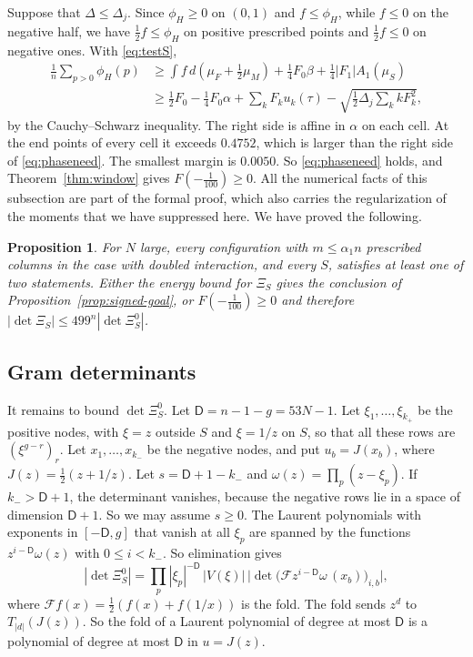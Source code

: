 \documentclass[11pt]{amsart}
\newtheorem{proposition}[theorem]{Proposition}
\theoremstyle{definition}
\theoremstyle{remark}
\numberwithin{equation}{section}
\begin{document}
Suppose that $\Delta\le\Delta_j$. Since $\phi_H\ge0$ on $(0,1)$ and $f\le\phi_H$, while $f\le0$ on the negative
half, we have $\frac12f\le\phi_H$ on positive prescribed points and $\frac12f\le0$ on negative ones. With
\eqref{eq:testS},
\begin{align*}
 \frac1n\sum_{p>0}\phi_H(p)&\ge\int f\,d(\mu_F+\tfrac12\mu_M)+\tfrac14F_0\beta+\tfrac14|F_1|A_1(\mu_S)\\
 &\ge\tfrac12F_0-\tfrac14F_0\alpha+\sum_kF_ku_k(\tau)-\sqrt{\tfrac12\Delta_j\sum_kkF_k^2},
\end{align*}
by the Cauchy--Schwarz inequality. The right side is affine in $\alpha$ on each cell. At the end points of every cell it exceeds
$0.4752$, which is larger than the right side of \eqref{eq:phaseneed}. The smallest margin is $0.0050$. So \eqref{eq:phaseneed} holds, and
Theorem~\ref{thm:window} gives $F(-\frac1{100})\ge0$. All the numerical facts of this subsection are part of the formal proof, which also carries the regularization of the moments that we have suppressed here. We have proved the following.

\begin{proposition}\label{prop:alternative}
For $N$ large, every configuration with $m\le\alpha_1n$ prescribed columns in the case with doubled interaction, and
every $S$, satisfies at least one of two statements. Either the energy bound for $\Xi_S$ gives the conclusion
of Proposition~\ref{prop:signed-goal}, or $F(-\frac1{100})\ge0$ and therefore
$|\det\Xi_S|\le499^n|\det\Xi^0_S|$.
\end{proposition}

\subsection{Gram determinants}\label{ssec:gram}
It remains to bound $\det\Xi^0_S$. Let $\mathsf D=n-1-g=53N-1$. Let $\xi_1,\ldots,\xi_{k_+}$ be the positive nodes, with
$\xi=z$ outside $S$ and $\xi=1/z$ on $S$, so that all these rows are $(\xi^{g-r})_r$. Let $x_1,\ldots,x_{k_-}$ be the
negative nodes, and put $u_b=J(x_b)$, where $J(z)=\frac12(z+1/z)$. Let $s=\mathsf D+1-k_-$ and $\omega(z)=\prod_p(z-\xi_p)$. If
$k_->\mathsf D+1$, the determinant vanishes, because the negative rows lie in a space of dimension $\mathsf D+1$. So we may assume
$s\ge0$. The Laurent polynomials with exponents in $[-\mathsf D,g]$ that vanish at all $\xi_p$ are spanned by the functions
$z^{i-\mathsf D}\omega(z)$ with $0\le i<k_-$. So elimination gives
\begin{equation}\label{eq:split}
 |\det\Xi^0_S|=\prod_p|\xi_p|^{-\mathsf D}\,|V(\xi)|\,\bigl|\det\bigl(\mathcal Fz^{i-\mathsf D}\omega\,(x_b)\bigr)_{i,b}\bigr|,
\end{equation}
where $\mathcal Ff(x)=\frac12(f(x)+f(1/x))$ is the fold. The fold sends $z^d$ to $T_{|d|}(J(z))$. So the fold of a Laurent
polynomial of degree at most $\mathsf D$ is a polynomial of degree at most $\mathsf D$ in $u=J(z)$.
\end{document}

